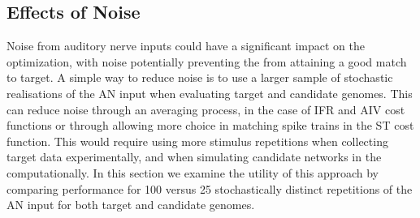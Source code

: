 % 
% 
% 




\subsection{Effects of Noise}\label{sec:GA:effects-noise}

Noise from auditory nerve inputs could have a significant impact on the {\GA}
optimization, with noise potentially preventing the {\GA} from attaining a good
match to target. A simple way to reduce noise is to use a larger sample of
stochastic realisations of the AN input when evaluating target and candidate
genomes. This can reduce noise through an averaging process, in the case of IFR
and AIV cost functions or through allowing more choice in matching spike trains
in the ST cost function. This would require using more stimulus repetitions when
collecting target data experimentally, and when simulating candidate networks in
the {\GA} computationally. In this section we examine the utility of this
approach by comparing {\GA} performance for 100 versus 25 stochastically
distinct repetitions of the AN input for both target and candidate genomes.

\smallskip{}



